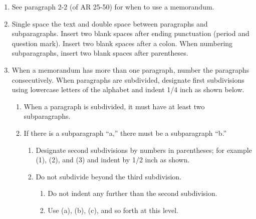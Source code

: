 \documentclass{armymemo}
\author{John W. Smith}\rank{CPT}\branch{CY}
\begin{document}
\begin{enumerate}
\item See paragraph 2-2 (of AR 25-50) for when to use a memorandum.
\item Single space the text and double space between paragraphs and subparagraphs. Insert two blank spaces after ending punctuation (period and question mark). Insert two blank spaces after a colon. When numbering subparagraphs, insert two blank spaces after parentheses.
\item When a memorandum has more than one paragraph, number the paragraphs consecutively. When paragraphs are subdivided, designate first subdivisions using lowercase letters of the alphabet and indent 1/4 inch as shown below.
  \begin{enumerate}
  \item When a paragraph is subdivided, it must have at least two subparagraphs.
  \item If there is a subparagraph ``a,'' there must be a subparagraph ``b.''
    \begin{enumerate}
    \item Designate second subdivisions by numbers in parentheses; for example (1), (2), and (3) and indent by 1/2 inch as shown.
    \item Do not subdivide beyond the third subdivision.
      \begin{enumerate}
      \item Do not indent any further than the second subdivision.
      \item Use (a), (b), (c), and so forth at this level.
      \end{enumerate}
    \end{enumerate}
  \end{enumerate}
\end{enumerate}
\end{document}
